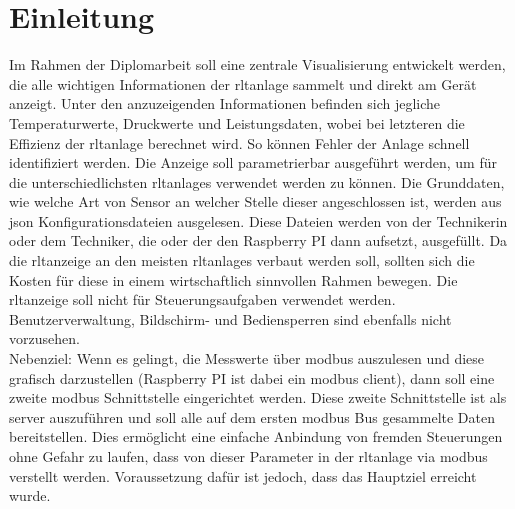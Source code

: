 \chapter{Einleitung} 
\label{aufgabenstellung}
\noindent Im Rahmen der Diplomarbeit soll eine zentrale Visualisierung entwickelt werden, die alle wichtigen Informationen der \ac{rltanlage} sammelt und direkt am Gerät anzeigt. Unter den anzuzeigenden Informationen befinden sich jegliche Temperaturwerte, Druckwerte und Leistungsdaten, wobei bei letzteren die Effizienz der \ac{rltanlage} berechnet wird. So können Fehler der Anlage schnell identifiziert werden.
Die Anzeige soll parametrierbar ausgeführt werden, um für die unterschiedlichsten 
\acp{rltanlage} verwendet werden zu können. Die Grunddaten, wie \zB welche Art von 
Sensor \bzw an welcher Stelle dieser angeschlossen ist, werden aus \ac{json} Konfigurationsdateien ausgelesen. Diese Dateien werden von der Technikerin oder dem Techniker, die oder der den Raspberry PI dann aufsetzt, ausgefüllt.
Da die \ac{rltanzeige} an den meisten \acp{rltanlage} verbaut werden soll, sollten sich die Kosten für diese in einem wirtschaftlich sinnvollen Rahmen bewegen.
Die \ac{rltanzeige} soll nicht für Steuerungsaufgaben verwendet werden. Benutzerverwaltung, 
Bildschirm- und Bediensperren sind ebenfalls nicht vorzusehen. \\

Nebenziel:
Wenn es gelingt, die Messwerte über \gls{modbus} auszulesen und diese grafisch darzustellen (Raspberry PI ist dabei ein \gls{modbus} \gls{client}), dann soll eine zweite \gls{modbus} Schnittstelle eingerichtet werden. Diese zweite Schnittstelle ist als \gls{server} auszuführen und soll alle auf dem ersten \gls{modbus} Bus gesammelte Daten bereitstellen. Dies ermöglicht eine einfache Anbindung von fremden Steuerungen ohne Gefahr zu laufen, dass von dieser Parameter in der \ac{rltanlage} via \gls{modbus} verstellt werden. Voraussetzung dafür ist jedoch, dass das Hauptziel erreicht wurde.

